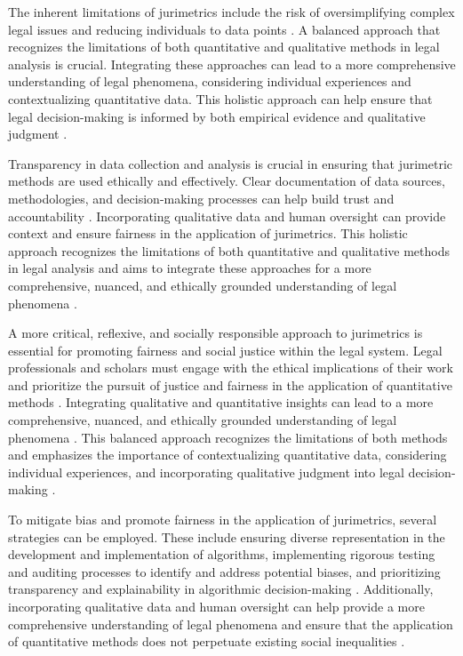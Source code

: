 The inherent limitations of jurimetrics include the risk of oversimplifying complex legal issues and reducing individuals to data points \cite{10.1590/dados.2022.65.3.267,10.1080/07329113.2015.1046739}. A balanced approach that recognizes the limitations of both quantitative and qualitative methods in legal analysis is crucial. Integrating these approaches can lead to a more comprehensive understanding of legal phenomena, considering individual experiences and contextualizing quantitative data. This holistic approach can help ensure that legal decision-making is informed by both empirical evidence and qualitative judgment \cite{mendes2016}.

Transparency in data collection and analysis is crucial in ensuring that jurimetric methods are used ethically and effectively. Clear documentation of data sources, methodologies, and decision-making processes can help build trust and accountability \cite{unger2021process}. Incorporating qualitative data and human oversight can provide context and ensure fairness in the application of jurimetrics. This holistic approach recognizes the limitations of both quantitative and qualitative methods in legal analysis and aims to integrate these approaches for a more comprehensive, nuanced, and ethically grounded understanding of legal phenomena \cite{10.1590/dados.2022.65.3.267,10.1057/s41599-020-00557-0}.

A more critical, reflexive, and socially responsible approach to jurimetrics is essential for promoting fairness and social justice within the legal system. Legal professionals and scholars must engage with the ethical implications of their work and prioritize the pursuit of justice and fairness in the application of quantitative methods \cite{10.5040/9781350220645,10.1080/07329113.2015.1046739}. Integrating qualitative and quantitative insights can lead to a more comprehensive, nuanced, and ethically grounded understanding of legal phenomena \cite{10.5040/9781350220645,10.1080/07329113.2015.1046739}. This balanced approach recognizes the limitations of both methods and emphasizes the importance of contextualizing quantitative data, considering individual experiences, and incorporating qualitative judgment into legal decision-making \cite{10.5040/9781350220645,10.1080/07329113.2015.1046739}.

To mitigate bias and promote fairness in the application of jurimetrics, several strategies can be employed. These include ensuring diverse representation in the development and implementation of algorithms, implementing rigorous testing and auditing processes to identify and address potential biases, and prioritizing transparency and explainability in algorithmic decision-making \cite{10.1007/s11186-021-09453-1,10.3390/fi9040068}. Additionally, incorporating qualitative data and human oversight can help provide a more comprehensive understanding of legal phenomena and ensure that the application of quantitative methods does not perpetuate existing social inequalities \cite{10.1007/s11186-021-09453-1,10.3390/fi9040068}.

